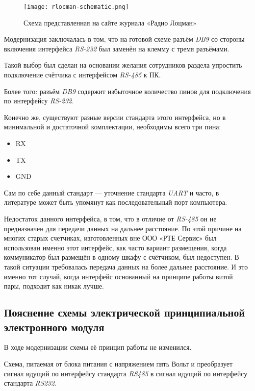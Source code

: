 \begin{figure}[H]
  \centering
  \texttt{[image: rlocman-schematic.png]}
  \caption{Схема представленная на сайте журнала «Радио Лоцман»}
\end{figure}

Модернизация заключалась в том,
что на готовой схеме разъём \textit{DB9}
со стороны включения интерфейса \textit{RS-232}
был заменён на клемму с тремя разъёмами.

Такой выбор был сделан на основании
желания сотрудников раздела
упростить подключение счётчика с интерфейсом \textit{RS-485} к ПК.

Более того: разъём \textit{DB9}
содержит избыточное количество
пинов для подключения по интерфейсу \textit{RS-232}.

Конечно же, существуют разные версии стандарта этого интерфейса,
но в минимальной и достаточной комплектации,
необходимы всего три пина:
\begin{itemize}
\item RX
\item TX
\item GND
\end{itemize}

Сам по себе данный стандарт — уточнение
стандарта \textit{UART} и часто, в литературе может быть упомянут как
последовательный порт компьютера.

Недостаток данного интерфейса, в том,
что в отличие от \textit{RS-485}
он не предназначен для передачи данных на дальнее расстояние.
По этой причине на многих старых счетчиках,
изготовленных вне ООО «РТЕ Сервис» был
использован именно этот интерфейс,
как часто вариант размещения,
когда коммуникатор был размещён в одному шкафу с счётчиком,
был недоступен.
В такой ситуации требовалась передача данных на более дальнее расстояние.
И это именно тот случай, когда интерфейс
основанный на принципе работы витой пары,
подходит как никак лучше.


\subsection{Пояснение схемы электрической принципиальной\\
  электронного модуля}

В ходе модернизации схемы её принцип работы не изменился.

Схема, питаемая от блока питания с напряжением пять Вольт
и преобразует сигнал идущий по интерфейсу
стандарта \textit{RS485} в сигнал идущий по интерфейсу
стандарта \textit{RS232}.


